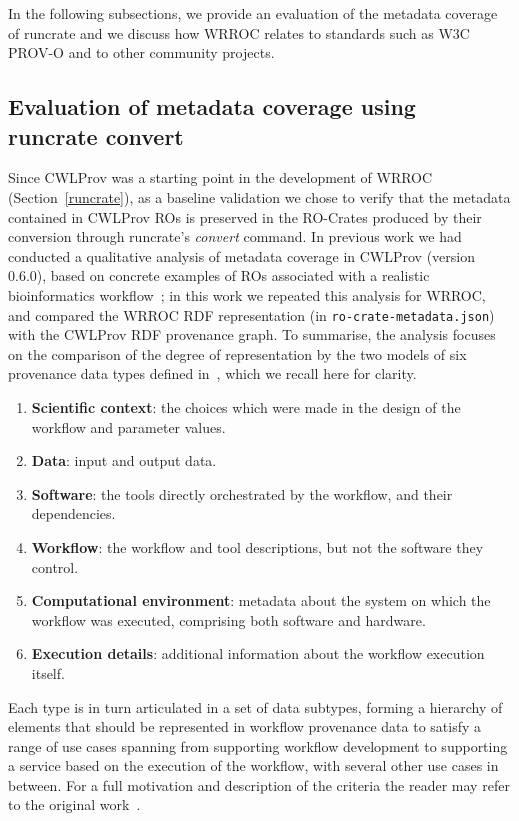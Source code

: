 \documentclass[10pt,letterpaper]{article}
\begin{document}
In the following subsections, we provide an evaluation of the metadata coverage of runcrate and we discuss how WRROC relates to standards such as W3C PROV-O and to other community projects.


\subsection{Evaluation of metadata coverage using runcrate convert}

Since CWLProv was a starting point in the development of WRROC (Section~\ref{runcrate}), as a baseline validation we chose to verify that the metadata contained in CWLProv ROs is preserved in the RO-Crates produced by their conversion through runcrate's \emph{convert} command. In previous work we had conducted a qualitative analysis of metadata coverage in CWLProv (version 0.6.0), based on concrete examples of ROs associated with a realistic bioinformatics workflow~\cite{De Wit 2022};
in this work we repeated this analysis for WRROC, and compared the WRROC RDF representation (in \texttt{ro-crate-metadata.json}) with the CWLProv RDF provenance graph.
To summarise, the analysis focuses on the comparison of the degree of representation by the two models of six provenance data
types defined in~\cite{De Wit 2022}, which we recall here for clarity.
\begin{enumerate}[label={\bfseries T\arabic*.}]
  \item {\bf Scientific context}: the choices which were made in the design of the workflow and parameter values.
  \item {\bf Data}: input and output data.
  \item {\bf Software}: the tools directly orchestrated by the workflow, and their dependencies.
  \item {\bf Workflow}: the workflow and tool descriptions, but not the software they control.
  \item {\bf Computational environment}: metadata about the system on which the workflow was executed, comprising both software and hardware.
  \item {\bf Execution details}: additional information about the workflow execution itself.
\end{enumerate}
Each type is in turn articulated in a set of data subtypes, forming a hierarchy
of elements that should be represented in
workflow provenance data to satisfy a range of use cases spanning from
supporting workflow development to supporting a service based on the
execution of the workflow, with several other use cases in between.  For a full
motivation and description of the criteria the reader may refer to the original work~\cite{De Wit 2022}.
\end{document}
